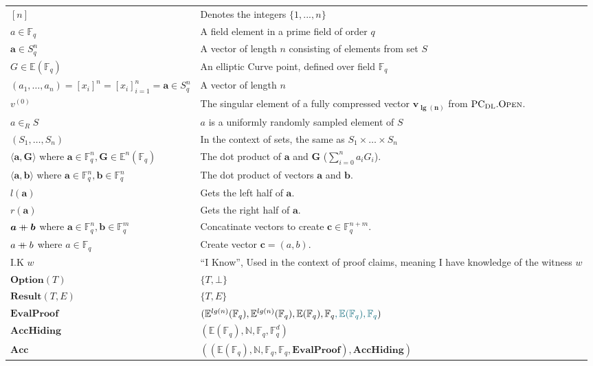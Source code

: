 \documentclass[
]{article}
\newcommand*\Fb{\mathbb{F}}
\newcommand*\Nb{\mathbb{N}}
\newcommand*\Eb{\mathbb{E}}
\newcommand*\cat{\mathbin{+\mkern-10mu+}}
\newcommand{\mathblue}[1]{\mathcolor{GbBlueDk}{#1}}
\renewcommand{\vec}[1]{ \boldsymbol{#1} }
\newcommand{\dotp}[2]{ \langle #1, #2 \rangle }
\newcommand*{\PCDL}{\text{PC}_{\text{DL}}}
\newcommand*{\PCDLOpen}{\PCDL.\mathrm{\text{O\scriptsize PEN}}}
\newcommand*\Result{\mathbf{Result}}
\newcommand*\Option{\mathbf{Option}}
\newcommand*\Acc{\mathbf{Acc}}
\newcommand*\AccHiding{\mathbf{AccHiding}}
\newcommand*\EvalProof{\mathbf{EvalProof}}
\begin{document}
\begin{longtable}[]{@{}
  >{\raggedright\arraybackslash}p{}
  >{\raggedright\arraybackslash}p{}@{}}
\toprule\noalign{}
\endhead
\bottomrule\noalign{}
\endlastfoot
\([n]\) & Denotes the integers \(\{ 1, ..., n \}\) \\
\(a \in \Fb_q\) & A field element in a prime field of order \(q\) \\
\(\vec{a} \in S^n_q\) & A vector of length \(n\) consisting of elements
from set \(S\) \\
\(G \in \Eb(\Fb_q)\) & An elliptic Curve point, defined over field
\(\Fb_q\) \\
\((a_1, \dots, a_n) = [x_i]^n = [x_i]_{i=1}^n = \vec{a} \in S^n_q\) & A
vector of length \(n\) \\
\(v^{(0)}\) & The singular element of a fully compressed vector
\(\vec{v_{\lg(n)}}\) from \(\PCDLOpen\). \\
\(a \in_R S\) & \(a\) is a uniformly randomly sampled element of
\(S\) \\
\((S_1, \dots, S_n)\) & In the context of sets, the same as
\(S_1 \times \dots \times S_n\) \\
\(\dotp{\vec{a}}{\vec{G}}\) where
\(\vec{a} \in \Fb^n_q, \vec{G} \in \Eb^n(\Fb_q)\) & The dot product of
\(\vec{a}\) and \(\vec{G}\) (\(\sum^n_{i=0} a_i G_i\)). \\
\(\dotp{\vec{a}}{\vec{b}}\) where
\(\vec{a} \in \Fb^n_q, \vec{b} \in \Fb^n_q\) & The dot product of
vectors \(\vec{a}\) and \(\vec{b}\). \\
\(l(\vec{a})\) & Gets the left half of \(\vec{a}\). \\
\(r(\vec{a})\) & Gets the right half of \(\vec{a}\). \\
\(\vec{a} \cat \vec{b}\) where
\(\vec{a} \in \Fb^n_q, \vec{b} \in \Fb^m_q\) & Concatinate vectors to
create \(\vec{c} \in \Fb^{n+m}_q\). \\
\(a \cat b\) where \(a \in \Fb_q\) & Create vector
\(\vec{c} = (a, b)\). \\
I.K \(w\) & ``I Know'', Used in the context of proof claims, meaning I
have knowledge of the witness \(w\) \\
\(\Option(T)\) & \(\{ T, \bot \}\) \\
\(\Result(T, E)\) & \(\{ T, E \}\) \\
\(\EvalProof\) &
\((\Eb^{lg(n)}(\Fb_q), \Eb^{lg(n)}(\Fb_q), \Eb(\Fb_q), \Fb_q\mathblue{, \Eb(\Fb_q), \Fb_q})\) \\
\(\AccHiding\) & \((\Eb(\Fb_q), \Nb, \Fb_q, \Fb^d_q)\) \\
\(\Acc\) &
\(((\Eb(\Fb_q), \Nb, \Fb_q, \Fb_q, \EvalProof), \AccHiding)\) \\
\end{longtable}
\end{document}
